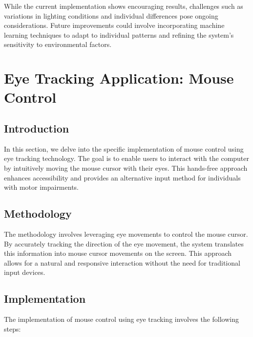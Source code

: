 \documentclass[letterpaper, 10 pt, conference]{ieeeconf}  %
\begin{document}
While the current implementation shows encouraging results, challenges such as variations in lighting conditions and individual differences pose ongoing considerations. Future improvements could involve incorporating machine learning techniques to adapt to individual patterns and refining the system's sensitivity to environmental factors.

\section{Eye Tracking Application: Mouse Control}

\subsection{Introduction}

In this section, we delve into the specific implementation of mouse control using eye tracking technology. The goal is to enable users to interact with the computer by intuitively moving the mouse cursor with their eyes. This hands-free approach enhances accessibility and provides an alternative input method for individuals with motor impairments.

\subsection{Methodology}

The methodology involves leveraging eye movements to control the mouse cursor. By accurately tracking the direction of the eye movement, the system translates this information into mouse cursor movements on the screen. This approach allows for a natural and responsive interaction without the need for traditional input devices.

\subsection{Implementation}

The implementation of mouse control using eye tracking involves the following steps:
\end{document}
